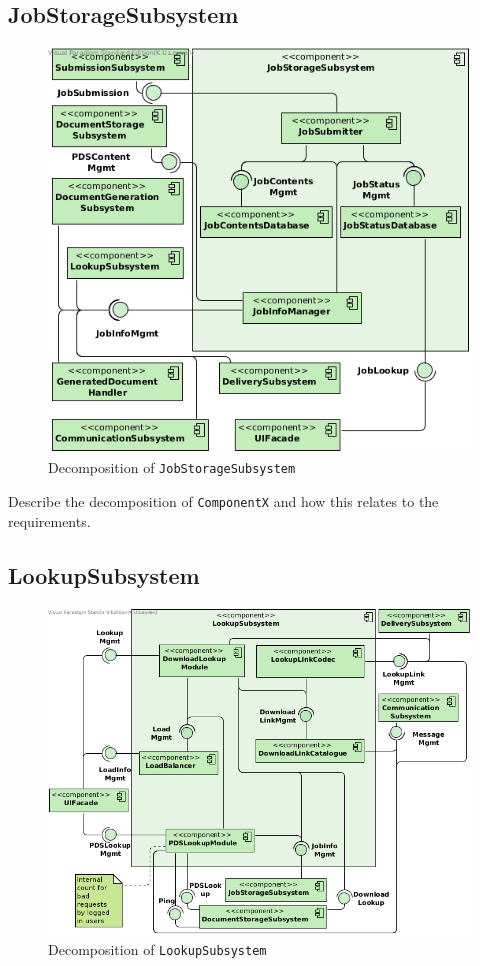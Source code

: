 \subsection{JobStorageSubsystem}
\begin{figure}[!htp]
    \centering
    \includegraphics[width=\textwidth]{figures/Job Storage Subsystem.png}
    \caption{Decomposition of \texttt{JobStorageSubsystem}}\label{fig:decomp-jobsub}
\end{figure}

Describe the decomposition of \texttt{ComponentX} and how this relates to the
requirements.

\subsection{LookupSubsystem}
\begin{figure}[!htp]
    \centering
    \includegraphics[width=\textwidth]{figures/Lookup Subsystem.png}
    \caption{Decomposition of \texttt{LookupSubsystem}}\label{fig:decomp-lookupsub}
\end{figure}

